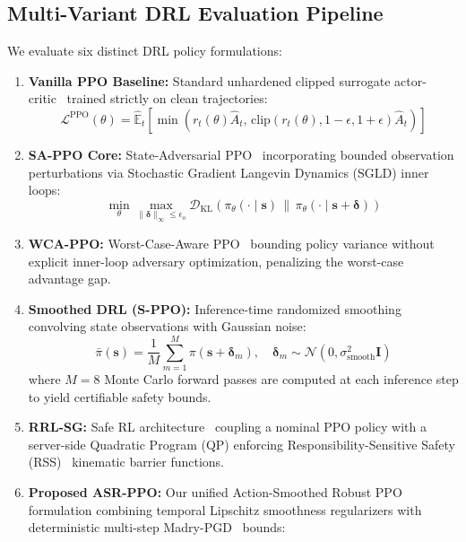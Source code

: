 \documentclass[conference]{IEEEtran}
\begin{document}
\subsection{Multi-Variant DRL Evaluation Pipeline}
We evaluate six distinct DRL policy formulations:
\begin{enumerate}
    \item \textbf{Vanilla PPO Baseline:} Standard unhardened clipped surrogate actor-critic~\cite{schulman2017} trained strictly on clean trajectories:
    \begin{equation}
        \mathcal{L}^{\text{PPO}}(\theta) = \hat{\mathbb{E}}_t \left[ \min\left(r_t(\theta)\hat{A}_t, \, \text{clip}(r_t(\theta), 1-\epsilon, 1+\epsilon)\hat{A}_t\right) \right]
    \end{equation}
    \item \textbf{SA-PPO Core:} State-Adversarial PPO~\cite{zhang2020sa} incorporating bounded observation perturbations via Stochastic Gradient Langevin Dynamics (SGLD) inner loops:
    \begin{equation}
        \min_\theta \max_{\|\boldsymbol{\delta}\|_\infty \le \epsilon_o} \mathcal{D}_{\text{KL}}(\pi_\theta(\cdot \mid \mathbf{s}) \,\|\, \pi_\theta(\cdot \mid \mathbf{s} + \boldsymbol{\delta}))
    \end{equation}
    \item \textbf{WCA-PPO:} Worst-Case-Aware PPO~\cite{liang2022wocar} bounding policy variance without explicit inner-loop adversary optimization, penalizing the worst-case advantage gap.
    \item \textbf{Smoothed DRL (S-PPO):} Inference-time randomized smoothing~\cite{sun2024breaking, kumar2022certifying} convolving state observations with Gaussian noise:
    \begin{equation}
        \bar{\pi}(\mathbf{s}) = \frac{1}{M} \sum_{m=1}^M \pi\left(\mathbf{s} + \boldsymbol{\delta}_m\right), \quad \boldsymbol{\delta}_m \sim \mathcal{N}(0, \sigma_{\text{smooth}}^2 \mathbf{I})
    \end{equation}
    where $M = 8$ Monte Carlo forward passes are computed at each inference step to yield certifiable safety bounds.
    \item \textbf{RRL-SG:} Safe RL architecture~\cite{he2024trustworthy} coupling a nominal PPO policy with a server-side Quadratic Program (QP) enforcing Responsibility-Sensitive Safety (RSS)~\cite{shalev2017formal} kinematic barrier functions.
    \item \textbf{Proposed ASR-PPO:} Our unified Action-Smoothed Robust PPO formulation combining temporal Lipschitz smoothness regularizers with deterministic multi-step Madry-PGD~\cite{madry2018towards} bounds:

\end{enumerate}
\end{document}
